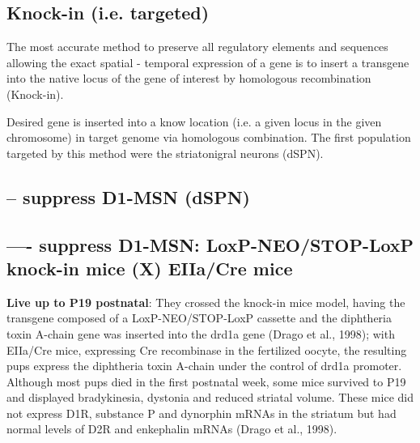 \subsection{Knock-in (i.e. targeted)}
\label{sec:knock-in-mouse-models}

The most accurate method to preserve all regulatory elements and sequences
allowing the exact spatial - temporal expression of a gene is to insert a
transgene into the native locus of the gene of interest by homologous
recombination (Knock-in).

Desired gene is inserted into a know location (i.e. a given locus in the given
chromosome) in target genome via homologous combination.
The first population targeted by this method were the striatonigral neurons
(dSPN). 

\subsection{-- suppress D1-MSN (dSPN)}

\subsection{---- suppress D1-MSN: LoxP-NEO/STOP-LoxP knock-in mice (X) EIIa/Cre
mice}

{\bf Live up to P19 postnatal}:
They crossed the knock-in mice model, having the transgene composed of a
LoxP-NEO/STOP-LoxP cassette and the diphtheria toxin A-chain gene was inserted
into the drd1a gene (Drago et al., 1998); with EIIa/Cre mice, expressing Cre
recombinase in the fertilized oocyte, the resulting pups express the diphtheria
toxin A-chain under the control of drd1a promoter.
Although most pups died in the first postnatal week, some mice survived to P19
and displayed bradykinesia, dystonia and reduced striatal volume. These mice did
not express D1R, substance P and dynorphin mRNAs in the striatum but had normal
levels of D2R and enkephalin mRNAs (Drago et al., 1998).

%   
%   
%   
%   
%   
